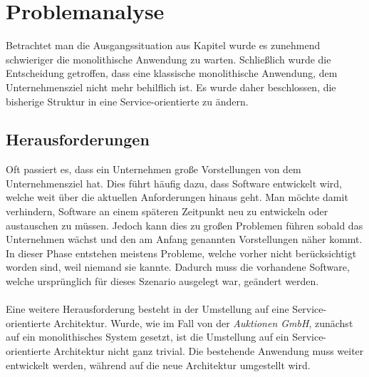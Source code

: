 \chapter{Problemanalyse}
\label{chap:analyse}
Betrachtet man die Ausgangssituation aus Kapitel  wurde es zunehmend schwieriger die monolithische Anwendung zu warten. Schließlich wurde die Entscheidung getroffen, dass eine klassische monolithische Anwendung, dem Unternehmensziel nicht mehr behilflich ist. Es wurde daher beschlossen, die bisherige Struktur in eine Service-orientierte zu ändern.

\section{Herausforderungen}
\label{sec:herausforderung}
Oft passiert es, dass ein Unternehmen große Vorstellungen von dem Unternehmensziel hat. Dies führt häufig dazu, dass Software entwickelt wird, welche weit über die aktuellen Anforderungen hinaus geht. Man möchte damit verhindern, Software an einem späteren Zeitpunkt neu zu entwickeln oder austauschen zu müssen. Jedoch kann dies zu großen Problemen führen sobald das Unternehmen wächst und den am Anfang genannten Vorstellungen näher kommt. In dieser Phase entstehen meistens Probleme, welche vorher nicht berücksichtigt worden sind, weil niemand sie kannte. Dadurch muss die vorhandene Software, welche ursprünglich für dieses Szenario ausgelegt war, geändert werden.
\\\\
Eine weitere Herausforderung besteht in der Umstellung auf eine Service-orientierte Architektur. Wurde, wie im Fall von der \textit{Auktionen GmbH}, zunächst auf ein monolithisches System gesetzt, ist die Umstellung auf ein Service-orientierte Architektur nicht ganz trivial. Die bestehende Anwendung muss weiter entwickelt werden, während auf die neue Architektur umgestellt wird.

